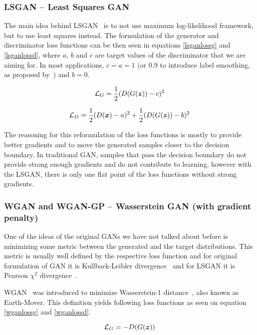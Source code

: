 \subsubsection{LSGAN -- Least Squares GAN}
The main idea behind LSGAN~\cite{lsgan} is to not use maximum log-likelihood framework, but to use least squares instead. The formulation of the generator and discriminator loss functions can be then seen in equations \ref{lsganlossg} and \ref{lsganlossd}, where $a$, $b$ and $c$ are target values of the discriminator that we are aiming for. In most applications, $c = a = 1$ (or 0.9 to introduce label smoothing, as proposed by~\cite{improvedgan,smooth}) and $b = 0$.

\begin{equation}
\mathcal{L}_G = \frac{1}{2}(D(G(\bm{z})) - c)^2
\label{lsganlossg}
\end{equation}

\begin{equation}
\mathcal{L}_D = \frac{1}{2}(D(\bm{x}) - a)^2 + \frac{1}{2}(D(G(\bm{z})) - b)^2
\label{lsganlossd}
\end{equation}

The reasoning for this reformulation of the loss functions is mostly to provide better gradients and to move the generated samples closer to the decision boundary. In traditional GAN, samples that pass the decision boundary do not provide strong enough gradients and do not contribute to learning, however with the LSGAN, there is only one flat point of the loss functions without strong gradients.

\subsubsection{WGAN and WGAN-GP -- Wasserstein GAN (with gradient penalty)}

One of the ideas of the original GANs we have not talked about before is minimizing some metric between the generated and the target distributions. This metric is usually well defined by the respective loss function and for original formulation of GAN it is Kullback-Leibler divergence~\cite{kullback} and for LSGAN it is Pearson $\chi^2$ divergence~\cite{pearson}.

WGAN~\cite{wgan} was introduced to minimize Wasserstein-1 distance~\cite{wasser}, also known as Earth-Mover. This definition yields following loss functions as seen on equation \ref{wganlossg} and \ref{wganlossd}.

\begin{equation}
\mathcal{L}_G = -D(G(\bm{z}))
\label{wganlossg}
\end{equation}

